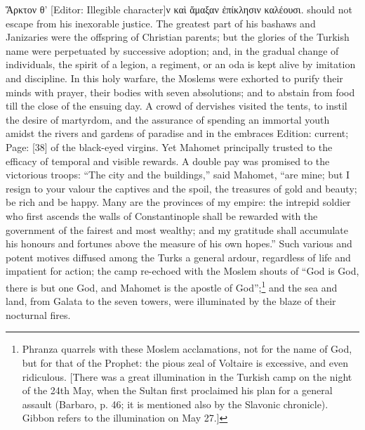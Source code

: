 {{}\textgreek{\texthebrew{Ἅ}ρκτον θ}\texthebrew{}’ [Editor: Illegible character]\textgreek{ν κα\texthebrew{ὶ ἅ}μαξαν \texthebrew{ἐ}πίκλησιν καλέουσι}.} should not escape from his inexorable justice. The greatest part of his bashaws and Janizaries were the offspring of Christian parents; but the glories of the Turkish name were perpetuated by successive adoption; and, in the gradual change of individuals, the spirit of a legion, a regiment, or an oda is kept alive by imitation and discipline. In this holy warfare, the Moslems were exhorted to purify their minds with prayer, their bodies with seven absolutions; and to abstain from food till the close of the ensuing day. A crowd of dervishes visited the tents, to instil the desire of martyrdom, and the assurance of spending an immortal youth amidst the rivers and gardens of paradise and in the embraces Edition: current; Page: [38] of the black-eyed virgins. Yet Mahomet principally trusted to the efficacy of temporal and visible rewards. A double pay was promised to the victorious troops: \texthebrew{“}The city and the buildings,\texthebrew{}” said Mahomet, \texthebrew{“}are mine; but I resign to your valour the captives and the spoil, the treasures of gold and beauty; be rich and be happy. Many are the provinces of my empire: the intrepid soldier who first ascends the walls of Constantinople shall be rewarded with the government of the fairest and most wealthy; and my gratitude shall accumulate his honours and fortunes above the measure of his own hopes.\texthebrew{}” Such various and potent motives diffused among the Turks a general ardour, regardless of life and impatient for action; the camp re-echoed with the Moslem shouts of \texthebrew{“}God is God, there is but one God, and Mahomet is the apostle of God\texthebrew{}”;\footnote{Phranza quarrels with these Moslem acclamations, not for the name of God, but for that of the Prophet: the pious zeal of Voltaire is excessive, and even ridiculous. [There was a great illumination in the Turkish camp on the night of the 24th May, when the Sultan first proclaimed his plan for a general assault (Barbaro, p. 46; it is mentioned also by the Slavonic chronicle). Gibbon refers to the illumination on May 27.]} and the sea and land, from Galata to the seven towers, were illuminated by the blaze of their nocturnal fires.

